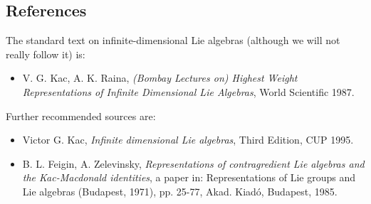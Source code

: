 \documentclass[etingof-lie.tex]{subfiles}
\begin{document}
\subsection{References}

The standard text on infinite-dimensional Lie algebras (although we will not
really follow it) is:

\begin{itemize}
\item V. G. Kac, A. K. Raina, \textit{(Bombay Lectures on) Highest Weight
Representations of Infinite Dimensional Lie Algebras}, World Scientific 1987.
\end{itemize}

Further recommended sources are:

\begin{itemize}
\item Victor G. Kac, \textit{Infinite dimensional Lie algebras}, Third
Edition, CUP 1995.

\item B. L. Feigin, A. Zelevinsky, \textit{Representations of contragredient
Lie algebras and the Kac-Macdonald identities}, a paper in: Representations of
Lie groups and Lie algebras (Budapest, 1971), pp. 25-77, Akad. Kiad\'{o},
Budapest, 1985.
\end{itemize}
\end{document}
